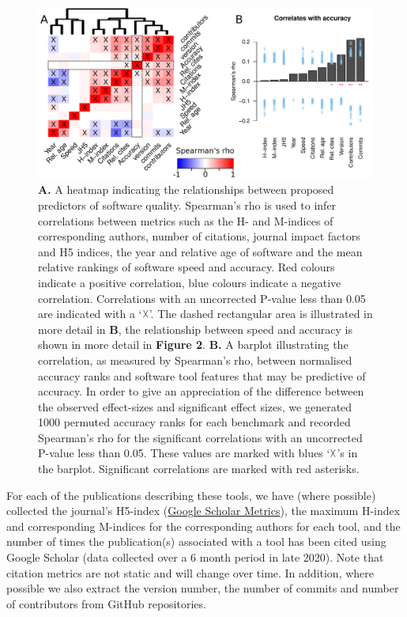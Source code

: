\documentclass[fleqn,10pt]{SelfArx} %
\begin{document}
\begin{figure}[htb!]
\includegraphics[width=\textwidth]{figure1.pdf}
\caption{\textbf{A.} A heatmap indicating the relationships between
  proposed predictors of software quality. Spearman’s rho is used to
  infer correlations between metrics such as the H- and M-indices of
  corresponding authors, number of citations, journal impact factors
  and H5 indices, the year and relative age of software and the mean
  relative rankings of software speed and accuracy. Red colours
  indicate a positive correlation, blue colours indicate a negative
  correlation. Correlations with an uncorrected P-value less than 0.05 are
  indicated with a `$\vartimes$'. The dashed rectangular area is illustrated in
  more detail in \textbf{B}, the relationship between speed and
  accuracy is shown in more detail in \textbf{Figure 2}.
  \textbf{B.} A barplot illustrating the correlation, as measured by
  Spearman’s rho, between normalised accuracy ranks and software tool
  features that may be predictive of accuracy. In order to give an
  appreciation of the difference between the observed effect-sizes and
  significant effect sizes, we generated 1000 permuted accuracy ranks
  for each benchmark and recorded Spearman’s rho for the significant
  correlations with an uncorrected P-value less than 0.05.
  These values are marked with blues `$\vartimes$'s in the
  barplot. Significant correlations are marked with red asterisks.}
\label{fig:allfactors}
\end{figure}


For each of the publications describing these tools, we have (where
possible) collected the journal's H5-index (\href{https://scholar.google.co.nz/citations?view\_op=top\_venues\&hl=en}{Google
  Scholar Metrics}), the maximum H-index and
corresponding M-indices \cite{Hirsch2005-mt} for the corresponding
authors for each tool, and the number of times the publication(s)
associated with a tool has been cited using Google Scholar (data
collected over a 6 month period in late 2020). Note that citation metrics
are not static and will change over time. In addition, where possible we also extract the version number, the number
of commits and number of contributors from GitHub repositories.  
\end{document}
